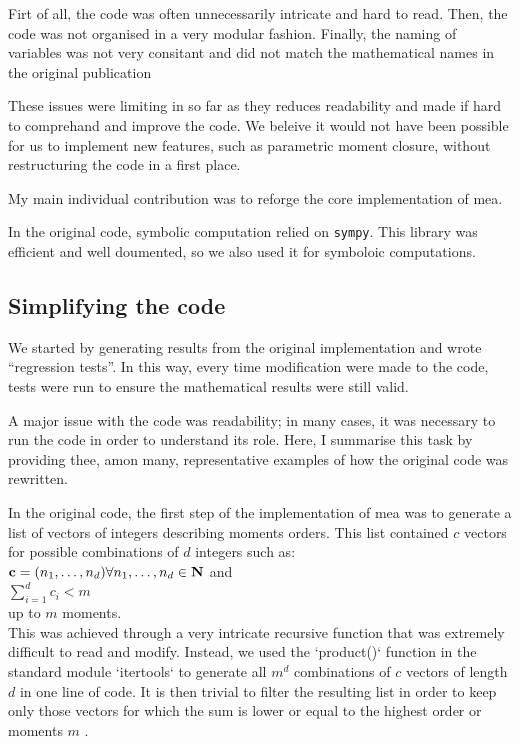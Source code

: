 \documentclass[11pt,a4paper]{article}
\newcommand{\sympy}{\texttt{sympy}}
\newcommand{\citationneeded}[2][]{\todo[color=brown, fancyline, #1]{\textbf{Citation Needed:} #2}}
\begin{document}
Firt of all, the code was often unnecessarily intricate and hard to read.
Then, the code was not organised in a very modular fashion.
Finally, the naming of variables was not very consitant and did not match the mathematical names in the original publication\cite{ale_general_2013}

These issues were limiting in so far as they reduces readability and made if hard to comprehand and improve the code.
We beleive it would not have been possible for us to implement new features, such as parametric moment closure,
 without restructuring the code in a first place.
  
My main individual contribution was to reforge the core implementation of \acrshort{mea}.

In the original code, symbolic computation relied on \sympy{}\citationneeded{}. 
This library was efficient and well doumented, so we also used it for symboloic computations.
 
\subsection{Simplifying the code}
We started by generating results from the original implementation and wrote ``regression tests''.
In this way, every time modification were made to the code, tests were run to ensure the mathematical results were still valid.

A major issue with the code was readability; in many cases, it was necessary to run the code in order to understand its role.
Here, I summarise this task by providing thee, amon many, representative examples of how the original code was rewritten. 

In the original code, the first step of the implementation of \acrshort{mea} was to generate a list of
 vectors of integers describing moments orders. 
This list contained $c$ vectors for possible combinations of $d$ integers such as:\\
$\mathbf{c} =(n_1, \dots, n_d) \forall{n_1, \dots, n_d \in \mathbf{N}}\\$
and\\ 
$\sum_{i=1}^{d} c_i < m$\\
up to $m$ moments.\\

This was achieved through a very intricate recursive function that was extremely difficult to read and modify.
Instead, we used the `product()` function in the standard module  `itertools` to generate all $m^d$ combinations of $c$ vectors of length  $d$ in one line of code.
It is then trivial to filter the resulting list in order to keep only those vectors for which the sum is lower or equal to the highest order  or moments $m$ .
\end{document}
